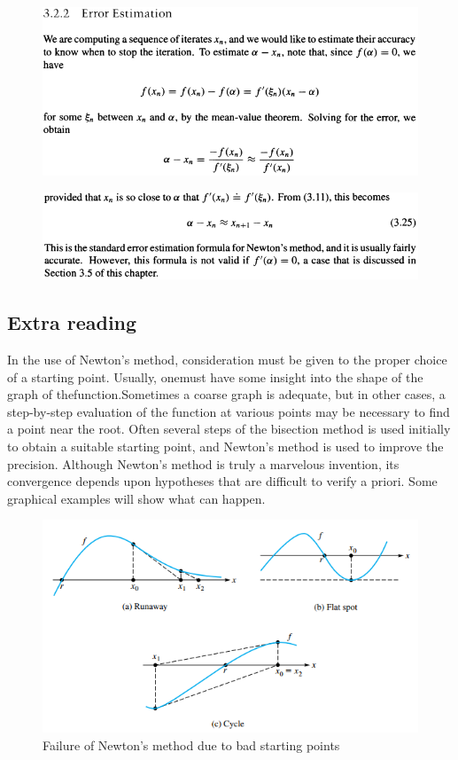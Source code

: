 \documentclass[12pt]{article}
\theoremstyle{theorem}
\begin{document}
\begin{figure}[h!]
	\centering
	\includegraphics[scale=0.8]{Figures/8}
\end{figure}

\begin{figure}[h!]
	\centering
	\includegraphics[scale=0.8]{Figures/9}
\end{figure}

\subsection{Extra reading}
In the use of Newton’s method, consideration must be given to the proper choice of a starting point. Usually, onemust have some insight into the shape of the graph of thefunction.Sometimes a coarse graph is adequate, but in other cases, a step-by-step evaluation of the function at various points may be necessary to find a point near the root. Often several steps of the bisection method is used initially to obtain a suitable starting point, and Newton’s method is used to improve the precision. Although Newton’s method is truly a marvelous invention, its convergence depends upon hypotheses that are difficult to verify a priori. Some graphical examples will show what can happen. 

\begin{figure}[h!]
	\centering
	\includegraphics[scale=0.8]{Figures/screenshot0017}
	\caption{Failure of Newton’s method due to bad starting points}
	\label{fig:screenshot0017}
\end{figure}
\end{document}

